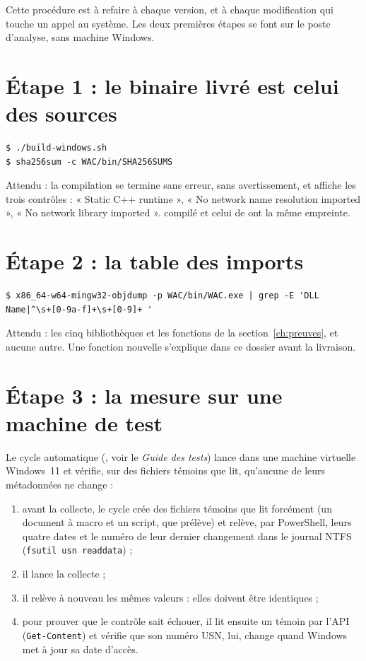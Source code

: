 \documentclass[11pt,a4paper,oneside]{report}
\begin{document}
Cette procédure est à refaire à chaque version, et à chaque modification qui
touche un appel au système. Les deux premières étapes se font sur le poste
d'analyse, sans machine Windows.

\section{Étape 1 : le binaire livré est celui des sources}

\begin{lstlisting}
$ ./build-windows.sh
$ sha256sum -c WAC/bin/SHA256SUMS
\end{lstlisting}

Attendu : la compilation se termine sans erreur, sans avertissement, et
affiche les trois contrôles : « Static C++ runtime », « No network name
resolution imported », « No network library imported ». 
compilé et celui de  ont la même empreinte.

\section{Étape 2 : la table des imports}

\begin{lstlisting}
$ x86_64-w64-mingw32-objdump -p WAC/bin/WAC.exe | grep -E 'DLL Name|^\s+[0-9a-f]+\s+[0-9]+ '
\end{lstlisting}

Attendu : les cinq bibliothèques et les fonctions de la
section~\ref{ch:preuves}, et aucune autre. Une fonction nouvelle
s'explique dans ce dossier avant la livraison.

\section{Étape 3 : la mesure sur une machine de test}

Le cycle automatique (, voir le \emph{Guide des
tests}) lance \wac{} dans une machine virtuelle Windows~11 et vérifie, sur des
fichiers témoins que \wac{} lit, qu'aucune de leurs métadonnées ne change :

\begin{enumerate}
  \item avant la collecte, le cycle crée des fichiers témoins que \wac{} lit
        forcément (un document à macro et un script, que 
        prélève) et relève, par PowerShell, leurs quatre dates et le numéro
        de leur dernier changement dans le journal NTFS
        (\texttt{fsutil usn readdata}) ;
  \item il lance la collecte ;
  \item il relève à nouveau les mêmes valeurs : elles doivent être identiques ;
  \item pour prouver que le contrôle sait échouer, il lit ensuite un témoin
        par l'API (\texttt{Get-Content}) et vérifie que son numéro USN, lui,
        change quand Windows met à jour sa date d'accès.
\end{enumerate}
\end{document}
